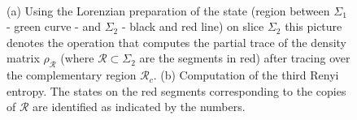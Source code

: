 \documentclass[11pt]{article}
\numberwithin{equation}{section}
\begin{document}
\begin{figure}[h!]
\begin{center}
 ~~~ ~ 
 \caption{\label{fig:appendixRho1} (a) Using the Lorenzian preparation of the state (region between $\Sigma_1$ - green curve - and $\Sigma_2$ - black and red line) on slice $\Sigma_2$ this picture denotes the operation that computes the partial trace of the density matrix $\rho_{\mathcal{R}}$ (where $\mathcal{R}\subset \Sigma_2$ are the segments in red) after tracing over the complementary region $\mathcal{R}_c$. (b) Computation of the third Renyi entropy. The states on the red segments corresponding to the copies of $\mathcal{R}$ are identified as indicated by the numbers.}
\end{center}
\end{figure}
\end{document}
